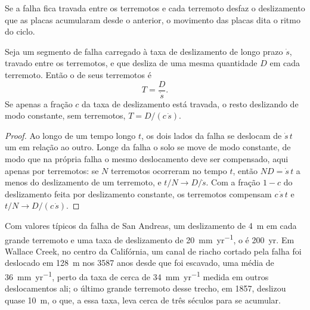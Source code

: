 Se a falha fica travada entre os terremotos e cada terremoto desfaz o deslizamento que as placas acumularam desde o anterior, o movimento das placas dita o ritmo do ciclo.

\begin{proposition}\label{prop:b1:earthquake-source:recurrence}
Seja um segmento de falha carregado à taxa de deslizamento de longo prazo $\dot s$, travado entre os terremotos, e que desliza de uma mesma quantidade $D$ em cada terremoto. Então o  de seus terremotos é
\[
  T = \frac{D}{\dot s} .
\]
Se apenas a fração $c$ da taxa de deslizamento está travada, o resto deslizando de modo constante, sem terremotos, $T = D/(c\,\dot s)$.
\end{proposition}

\begin{proof}
Ao longo de um tempo longo $t$, os dois lados da falha se deslocam de $\dot s\,t$ um em relação ao outro. Longe da falha o solo se move de modo constante, de modo que na própria falha o mesmo deslocamento deve ser compensado, aqui apenas por terremotos: se $N$ terremotos ocorreram no tempo $t$, então $N D = \dot s\,t$ a menos do deslizamento de um terremoto, e $t/N \to D/\dot s$. Com a fração $1-c$ do deslizamento feita por deslizamento constante, os terremotos compensam $c\,\dot s\,t$ e $t/N \to D/(c\,\dot s)$.
\end{proof}

Com valores típicos da falha de San Andreas, um deslizamento de \qty{4}{m} em cada grande terremoto e uma taxa de deslizamento de \qty{20}{mm.yr^{-1}}, o  é \qty{200}{yr}. Em Wallace Creek, no centro da Califórnia, um canal de riacho cortado pela falha foi deslocado em \qty{128}{m} nos \num{3587} anos desde que foi escavado, uma média de \qty{36}{mm.yr^{-1}}, perto da taxa de cerca de \qty{34}{mm.yr^{-1}} medida em outros deslocamentos ali; o último grande terremoto desse trecho, em 1857, deslizou quase \qty{10}{m}, o que, a essa taxa, leva cerca de três séculos para se acumular.


